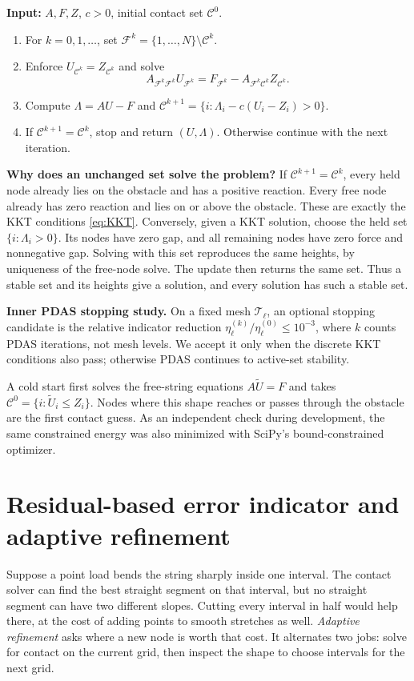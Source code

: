 \documentclass[11pt,a4paper]{article}
\newcommand{\sect}[1]{\Needspace{7\baselineskip}\section{#1}}
\begin{document}
\begin{algorithm}[H]
\caption{Primal--dual active-set (PDAS) method in exact arithmetic}\label{alg:pdas}
\textbf{Input:} $A,F,Z$, $c>0$, initial contact set $\mathcal C^0$.
\begin{enumerate}
\item For $k=0,1,\ldots$, set $\mathcal F^k=\{1,\ldots,N\}\setminus\mathcal C^k$.
\item Enforce $U_{\mathcal C^k}=Z_{\mathcal C^k}$ and solve
\[
 A_{\mathcal F^k\mathcal F^k}U_{\mathcal F^k}
 =F_{\mathcal F^k}-A_{\mathcal F^k\mathcal C^k}Z_{\mathcal C^k}.
\]
\item Compute $\Lambda=AU-F$ and
$\mathcal C^{k+1}=\{i:\Lambda_i-c(U_i-Z_i)>0\}$.
\item If $\mathcal C^{k+1}=\mathcal C^k$, stop and return $(U,\Lambda)$.
Otherwise continue with the next iteration.
\end{enumerate}
\end{algorithm}
\textbf{Why does an unchanged set solve the problem?} If $\mathcal C^{k+1}=\mathcal C^k$, every held node already lies on the obstacle and has a positive reaction. Every free node already has zero reaction and lies on or above the obstacle. These are exactly the KKT conditions \eqref{eq:KKT}. Conversely, given a KKT solution, choose the held set $\{i:\Lambda_i>0\}$. Its nodes have zero gap, and all remaining nodes have zero force and nonnegative gap. Solving with this set reproduces the same heights, by uniqueness of the free-node solve. The update then returns the same set. Thus a stable set and its heights give a solution, and every solution has such a stable set.

\textbf{Inner PDAS stopping study.} On a fixed mesh $\mathcal T_\ell$,
an optional stopping candidate is the relative indicator reduction
$\eta_\ell^{(k)}/\eta_\ell^{(0)}\leq10^{-3}$, where $k$ counts PDAS
iterations, not mesh levels. We accept it only when the discrete KKT
conditions also pass; otherwise PDAS continues to active-set stability.

A cold start first solves the free-string equations $A\widetilde U=F$ and takes $\mathcal C^0=\{i:\widetilde U_i\leq Z_i\}$. Nodes where this shape reaches or passes through the obstacle are the first contact guess. As an independent check during development, the same constrained energy was also minimized with SciPy's bound-constrained optimizer.

\sect{Residual-based error indicator and adaptive refinement}\label{sec:indicator}
Suppose a point load bends the string sharply inside one interval. The contact solver can find the best straight segment on that interval, but no straight segment can have two different slopes. Cutting every interval in half would help there, at the cost of adding points to smooth stretches as well. \emph{Adaptive refinement} asks where a new node is worth that cost. It alternates two jobs: solve for contact on the current grid, then inspect the shape to choose intervals for the next grid.
\end{document}

